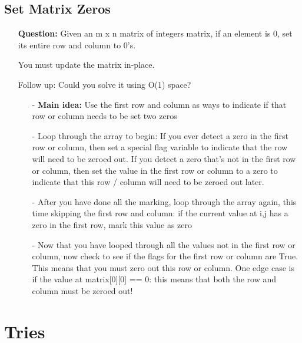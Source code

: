 \documentclass[12pt]{article}
\begin{document}
\subsection{Set Matrix Zeros}
\begin{enumerate}
  \item[] \textbf{Question:} Given an m x n matrix of integers matrix, if an element is 0, set its entire row and column to 0's.

You must update the matrix in-place.

Follow up: Could you solve it using O(1) space?

    \begin{enumerate}
      \item[-] \textbf{Main idea:} Use the first row and column as ways to indicate if that row or column needs to be set two zeros
      \item[-] Loop through the array to begin: If you ever detect a zero in the first row or column, then set a special flag variable to indicate that the row will need to be zeroed out. If you detect a zero that's not in the first row or column, then set the value in the first row or column to a zero to indicate that this row / column will need to be zeroed out later.
      \item[-] After you have done all the marking, loop through the array again, this time skipping the first row and column: if the current value at i,j has a zero in the first row, mark this value as zero
      \item[-] Now that you have looped through all the values not in the first row or column, now check to see if the flags for the first row or column are True. This means that you must zero out this row or column. One edge case is if the value at matrix[0][0] == 0: this means that both the row and column must be zeroed out!

    \end{enumerate}
\end{enumerate}







\section{Tries}
\end{document}
